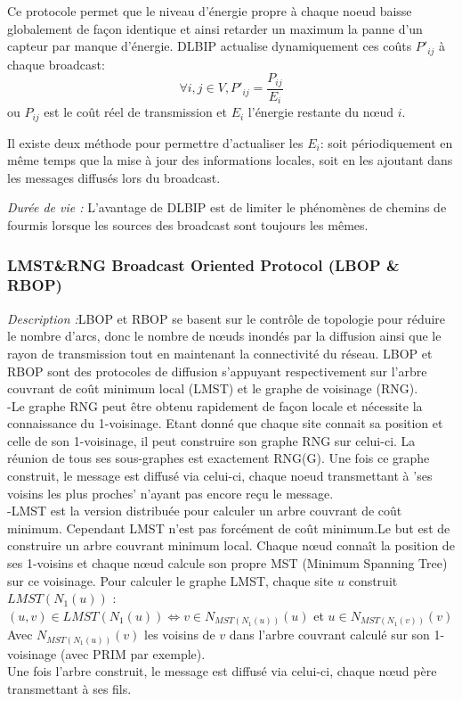 Ce protocole permet que le niveau d'énergie propre à chaque noeud baisse globalement de façon identique et ainsi 
retarder un maximum la panne d'un capteur par manque d'énergie.
DLBIP actualise dynamiquement ces coûts $P'_{ij}$ à chaque broadcast:
$$ \forall i,j \in V, P'_{ij}=\frac{P_{ij}}{E_i}$$
ou $P_{ij}$ est le coût réel de transmission et $E_i$ l'énergie restante du nœud $i$.

Il existe deux méthode pour permettre d'actualiser les $E_i$: soit périodiquement en même temps que la mise à jour des informations locales, soit en les ajoutant dans les messages diffusés lors du broadcast.




\emph{Durée de vie :} L'avantage de DLBIP est de limiter le phénomènes de chemins de fourmis lorsque les sources des broadcast sont toujours les mêmes.

\subsubsection{LMST\&RNG Broadcast Oriented Protocol (LBOP \& RBOP) \cite{Cartigny2005}}



\emph{Description :}LBOP et RBOP se basent sur le contrôle de topologie pour réduire le nombre d'arcs, donc 
le nombre de nœuds inondés par la diffusion ainsi que le rayon de transmission tout en maintenant la connectivité
du réseau. LBOP et RBOP sont des protocoles de diffusion s'appuyant respectivement sur l'arbre couvrant de 
coût minimum local (LMST) et le graphe de voisinage (RNG).\\

-Le graphe RNG peut être obtenu rapidement de façon locale et nécessite la connaissance du 1-voisinage. Etant donné
que chaque site connait sa position et celle de son 1-voisinage, il peut construire son graphe RNG sur celui-ci. La
réunion de tous ses sous-graphes est exactement RNG(G). Une fois ce graphe construit, le message est diffusé via 
celui-ci, chaque noeud  transmettant à 'ses voisins les plus proches' n'ayant pas encore reçu le message.\\

-LMST est la version distribuée pour calculer un arbre couvrant de coût minimum. Cependant LMST n'est pas forcément de 
coût minimum.Le but est de construire un arbre couvrant minimum local. Chaque nœud connaît la position de ses 1-voisins 
 et chaque nœud calcule son propre MST (Minimum Spanning Tree) sur ce voisinage.
Pour calculer le graphe LMST, chaque site $u$ construit $LMST(N_1(u))$ : \\
 $(u,v) \in LMST(N_1(u)) \Leftrightarrow v \in N_{MST(N_1(u))}(u)$ et $ u \in N_{MST(N_1(v))}(v)$\\
Avec $N_{MST(N_1(u))}(v)$ les voisins de $v$ dans l'arbre couvrant calculé sur son 1-voisinage (avec PRIM par exemple).\\
Une fois l'arbre construit, le message est diffusé via celui-ci, chaque nœud père transmettant à ses fils.




